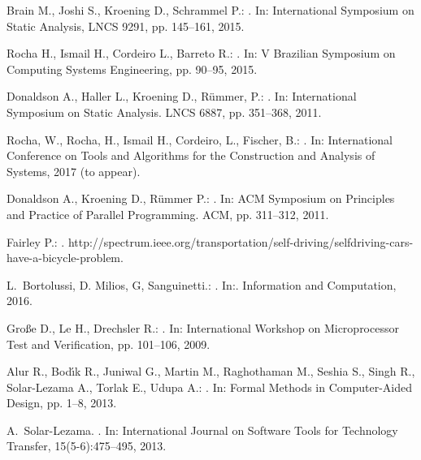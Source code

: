 \documentclass{acm_sen_article}
\begin{document}
{{\begin{thebibliography}{1}
Brain M., Joshi S., Kroening D., Schrammel P.:
.
\newblock In: International Symposium on Static Analysis, LNCS 9291, pp. 145--161, 2015.

Rocha H., Ismail H., Cordeiro L., Barreto R.:
.
\newblock In: V Brazilian Symposium on Computing Systems Engineering, pp. 90--95, 2015.

Donaldson A., Haller L., Kroening D., R{\"{u}}mmer, P.:
.
\newblock In: International Symposium on Static Analysis. LNCS 6887, pp. 351--368, 2011.

Rocha, W., Rocha, H., Ismail H., Cordeiro, L., Fischer, B.:
. 
\newblock In: International Conference on Tools and Algorithms for the Construction and Analysis of Systems, 2017 (to appear).

Donaldson A., Kroening D., R{\"{u}}mmer P.:
.
\newblock In: ACM Symposium on Principles and Practice of Parallel Programming. ACM, pp. 311--312, 2011.


Fairley P.:
.
\newblock http://spectrum.ieee.org/transportation/self-driving/selfdriving-cars-have-a-bicycle-problem.


L.~Bortolussi, D. Milios, G, Sanguinetti.:
.
\newblock In:. Information and Computation, 2016.


Gro{\ss}e D., Le H., Drechsler R.:
.
\newblock In: International Workshop on Microprocessor Test and Verification, pp. 101--106, 2009.

Alur R., Bod\'{\i}k R., Juniwal G., Martin M., Raghothaman M., Seshia S., Singh R., Solar-Lezama A., Torlak E., Udupa A.:
. 
\newblock In: Formal Methods in Computer-Aided Design, pp. 1--8, 2013.

A.~Solar-Lezama.
.
\newblock In: International Journal on Software Tools for Technology Transfer, 15(5-6):475--495, 2013.


\end{thebibliography}}}
\end{document}

